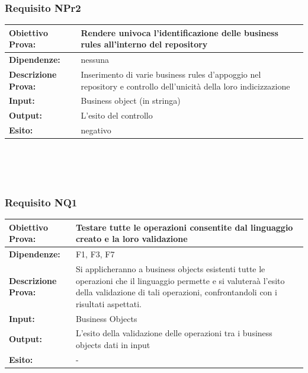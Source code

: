 \documentclass[11pt,titlepage,a4paper]{report}
\begin{document}
\subsubsection{Requisito NPr2}
\begin{tabular}{||p{4.5cm}||p{7.5cm}||}
\hline
{\textbf{Obiettivo Prova:}}& Rendere univoca l'identificazione delle business rules all'interno del repository \\ \hline
{\textbf{Dipendenze:}}& nessuna \\ \hline
{\textbf{Descrizione Prova:}}& Inserimento di varie business rules d'appoggio nel repository e controllo dell'unicit\`a della loro indicizzazione \\ \hline
{\textbf{Input:}}& Business object (in stringa) \\ \hline 
{\textbf{Output:}}& L'esito del controllo\\ \hline
{\textbf{Esito:}}& negativo \\ \hline
\end{tabular} \\
\\
\\
\subsubsection{Requisito NQ1}
\begin{tabular}{||p{4.5cm}||p{7.5cm}||}
\hline
{\textbf{Obiettivo Prova:}}& Testare tutte le operazioni consentite dal linguaggio creato e la loro validazione\\ \hline
{\textbf{Dipendenze:}}& F1, F3, F7 \\ \hline
{\textbf{Descrizione Prova:}}& Si applicheranno a business objects esistenti tutte le operazioni che il linguaggio permette e si valutera\`a l'esito della validazione di tali operazioni, confrontandoli con i risultati aspettati.  \\ \hline
{\textbf{Input:}}& Business Objects \\ \hline
{\textbf{Output:}}& L'esito della validazione delle operazioni tra i business objects dati in input\\ \hline
{\textbf{Esito:}}& - \\ \hline
\end{tabular} \\
\\
\\
\end{document}
